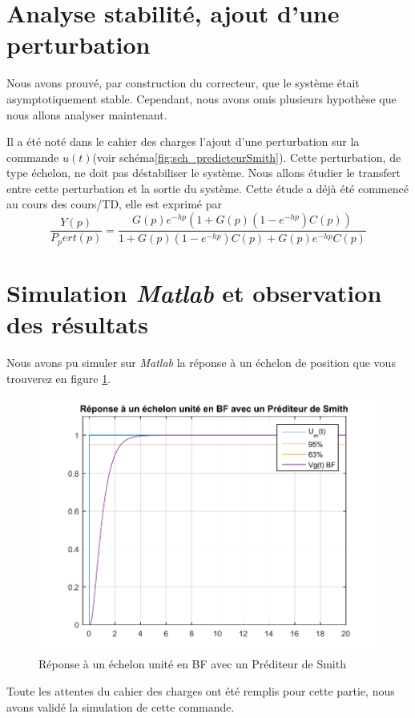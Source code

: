 \section{Analyse stabilité, ajout d'une perturbation}
Nous avons prouvé, par construction du correcteur, que le système était asymptotiquement stable. Cependant, nous avons omis plusieurs hypothèse que nous allons analyser maintenant.

 
Il a été noté dans le cahier des charges l'ajout d'une perturbation sur la commande $u(t)$(voir schéma\ref{fig:sch_predicteurSmith}). Cette perturbation, de type échelon, ne doit pas déstabiliser le système. Nous allons étudier le transfert entre cette perturbation et la sortie du système. Cette étude a déjà été commencé au cours des cours/TD, elle est exprimé par \begin{equation}
\frac{Y(p)}{P_pert(p)}=\frac{G(p)e^{-hp}\left(1+G(p)\left(1-e^{-hp}\right)C(p)\right)}{1+G(p)\left(1-e^{-hp}\right)C(p)+G(p)e^{-hp}C(p)}
\end{equation}

\section{Simulation \emph{Matlab} et observation des résultats}
Nous avons pu simuler sur \emph{Matlab} la réponse à un échelon de position que vous trouverez en figure \ref{fig:rep_echeonSmith}.\begin{figure}[!ht]
\centering
\includegraphics[width = .7\textwidth]{./IV/images/rep_echelonSmith.pdf}
\caption{Réponse à un échelon unité en BF avec un Préditeur de Smith}\label{fig:rep_echeonSmith}
\end{figure}

Toute les attentes du cahier des charges ont été remplis pour cette partie, nous avons validé la simulation de cette commande.

